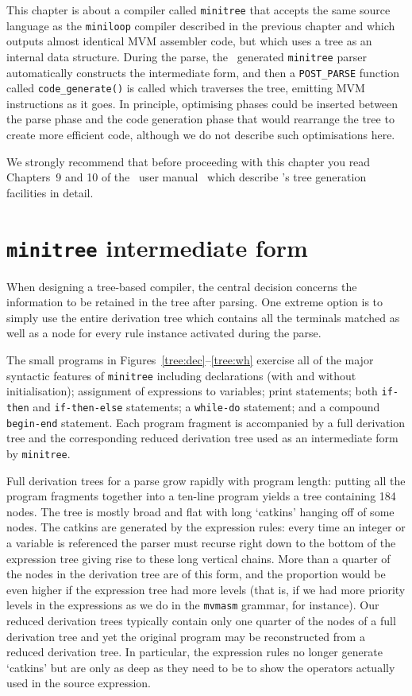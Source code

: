 This chapter is about a compiler called {\tt minitree} that accepts the
same source language as the {\tt miniloop} compiler described in the
previous chapter and which outputs almost identical MVM assembler code,
but which uses a tree as an internal data structure. During the parse,
the \rdp\ generated {\tt minitree} parser automatically constructs the
intermediate form, and then a \verb|POST_PARSE| function called
\verb|code_generate()| is called which traverses the tree, emitting MVM
instructions as it goes. In principle, optimising phases could be
inserted between the parse phase and the code generation phase that
would rearrange the tree to create more efficient code, although we do
not describe such optimisations here.

We strongly recommend that before proceeding with this chapter you read
Chapters~9 and 10 of the \rdp\ user manual~\cite{rdp:user:1.5} which
describe \rdp's tree generation facilities in detail.

\section{{\tt minitree} intermediate form}
When designing a tree-based compiler, the central decision concerns the information
to be retained in the tree after parsing. One extreme option is to simply use the
entire derivation tree which contains all the terminals matched as well as a node for
every rule instance activated during the parse.

The small programs in Figures~\ref{tree:dec}--\ref{tree:wh} exercise all
of the major syntactic features of {\tt minitree} including declarations
(with and without initialisation); assignment of expressions to
variables; print statements; both {\tt if-then} and {\tt if-then-else}
statements; a {\tt while-do} statement; and a compound {\tt begin-end}
statement. Each program fragment is accompanied by a full derivation
tree and the corresponding reduced derivation tree used as an
intermediate form by {\tt minitree}.

Full derivation trees for a parse grow rapidly with program length:
putting all the  program fragments together into a ten-line program
yields a tree containing 184 nodes. The tree is mostly broad and flat
with long `catkins' hanging off of some nodes. The catkins are generated
by the expression rules: every time an integer or a variable is
referenced the parser must recurse right down to the bottom of the
expression tree giving rise to these long vertical chains. More than a
quarter of the nodes in the derivation tree are of this form, and the
proportion would be even higher if the expression tree had more levels
(that is, if we had more priority levels in the expressions as we do in
the {\tt mvmasm} grammar, for instance). Our reduced derivation trees
typically contain only one quarter of the nodes of a full derivation
tree and yet the original program may be reconstructed from a reduced
derivation tree. In particular, the expression rules no longer generate
`catkins' but are only as deep as they need to be to show the operators
actually used in the source expression.

